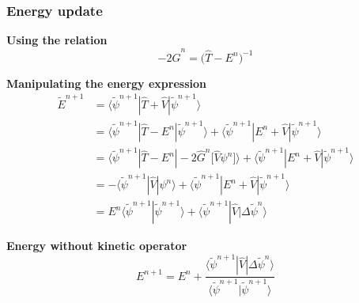 \begin{frame}
    \frametitle{Energy update}
    \centering
    \textbf{Using the relation}
    \begin{equation}
        \nonumber
        -2\hat{G}^n = \big(\hat{T} - E^n\big)^{-1}
    \end{equation}

    \vspace{5mm}

    \textbf{Manipulating the energy expression}
    \begin{align}
        \tilde{E}^{n+1}
        \nonumber
        &=	\langle\tilde{\psi}^{n+1}| \hat{T}+\hat{V} | \tilde{\psi}^{n+1}\rangle\\
        \nonumber
        &=	\langle\tilde{\psi}^{n+1}|  \hat{T} - E^n  | \tilde{\psi}^{n+1}\rangle
        +	\langle\tilde{\psi}^{n+1}|  E^n + \hat{V}  | \tilde{\psi}^{n+1}\rangle\\
        \nonumber
        &=	\langle\tilde{\psi}^{n+1}|  \hat{T} - E^n  |
	        -2\hat{G}^n\big[\hat{V}\psi^n\big]\rangle
        +	\langle\tilde{\psi}^{n+1}| E^n + \hat{V} |\tilde{\psi}^{n+1}\rangle\\
        \nonumber
        &= -\langle\tilde{\psi}^{n+1}| \hat{V} |\psi^{n}\rangle
        +	\langle\tilde{\psi}^{n+1}| E^n + \hat{V} |\tilde{\psi}^{n+1}\rangle\\
        \nonumber
        &= E^{n}\langle\tilde{\psi}^{n+1}|\tilde{\psi}^{n+1}\rangle +
	    \langle\tilde{\psi}^{n+1}| \hat{V} |\Delta\tilde{\psi}^{n}\rangle
    \end{align}

    \vspace{8mm}

    \centering
    \textbf{Energy without kinetic operator}
    \begin{equation}
        \nonumber
        E^{n+1} = E^{n} +
        \frac{\langle\tilde{\psi}^{n+1}| \hat{V} |\Delta\tilde{\psi}^{n}\rangle}
        {\langle\tilde{\psi}^{n+1}|\tilde{\psi}^{n+1}\rangle}
    \end{equation}
\end{frame}


